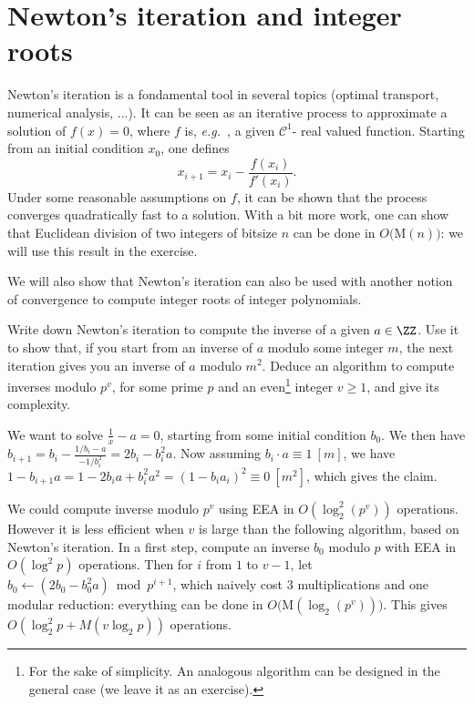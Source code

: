 \documentclass[11pt]{exam}
\theoremstyle{definition}
\begin{document}
{\begin{questions}
    \end{questions}
  
  \section{Newton's iteration and integer roots}
  Newton's iteration is a fondamental tool in several topics (optimal transport, numerical analysis, ...). It can be seen as an iterative process to approximate a solution of $f(x)=0$, where $f$ is, {\it e.g.~}, a given $\mathcal C^1$- real valued function. Starting from an initial condition $x_0$, one defines
  $$ x_{i+1} = x_i-\frac{f(x_i)}{f'(x_i)}.$$
  Under some reasonable assumptions on $f$, it can be shown that the process converges quadratically fast to a solution. With a bit more work, one can show that Euclidean division of two integers of bitsize $n$ can be done in $O(${\sc M}$(n))$: we will use this result in the exercise.

  We will also show that Newton's iteration can also be used with another notion of convergence to compute integer roots of integer polynomials.
  
  \begin{questions}

    \question Write down Newton's iteration to compute the inverse of a given $a\in \ZZ$. Use it to show that, if you start from an inverse of $a$ modulo some integer $m$, the next iteration gives you an inverse of $a$ modulo $m^2$. Deduce an algorithm to compute inverses modulo $p^v$, for some prime $p$ and an even\footnote{For the sake of simplicity. An analogous algorithm can be designed in the general case (we leave it as an exercise).} integer $v\geq 1$, and give its complexity.
    \begin{solution}
      We want to solve $\frac{1}{x}-a=0$, starting from some initial condition $b_0$. We then have $b_{i+1}=b_i-\frac{1/b_i-a}{-1/b_i^2}=2b_i-b_i^2a$. Now assuming $b_i\cdot a \equiv 1~[m]$, we have $1-b_{i+1}a=1-2b_ia+b_i^2a^2 = (1-b_ia_i)^2 \equiv 0~[m^2]$, which gives the claim.

      We could compute inverse modulo $p^v$ using EEA in $O(\log_2^2(p^v))$ operations. However it is less efficient when $v$ is large than the following algorithm, based on Newton's iteration. In a first step, compute an inverse $b_0$ modulo $p$ with EEA in $O(\log^2 p)$ operations. Then for $i$ from $1$ to $v-1$, let $b_0\gets (2b_0-b_0^2a)\bmod p^{i+1}$, which naively cost $3$ multiplications and one modular reduction: everything can be done in $O(${\sc M}$(\log_2(p^v)))$. This gives $O(\log_2^2p + M(v\log_2 p))$ operations.
    \end{solution}


\end{questions}}
\end{document}
